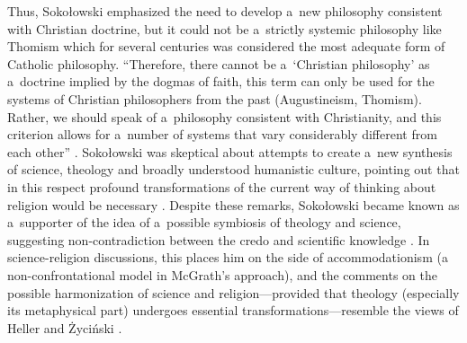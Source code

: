 \documentclass[%
  manuscript=article,
  year=2024,
  volume=77,
  doi=10.59203/zfn.77.689,
]{zfn}
\begin{document}
Thus, Sokołowski emphasized the need to develop a~new philosophy consistent with Christian doctrine, but it could not be a~strictly systemic philosophy like Thomism which for several centuries was considered the most adequate form of Catholic philosophy. ``Therefore, there cannot be a~‘Christian philosophy' as a~doctrine implied by the dogmas of faith, this term can only be used for the systems of Christian philosophers from the past (Augustineism, Thomism). Rather, we should speak of a~philosophy consistent with Christianity, and this criterion allows for a~number of systems that vary considerably different from each other''
\parencite[][p.199]{Sokoowski1989Gos}. %
 Sokołowski was skeptical about attempts to create a~new synthesis of science, theology and broadly understood humanistic culture, pointing out that in this respect profound transformations of the current way of thinking about religion would be necessary 
\parencite[][p.265]{Sokoowski1991Posowie}. %
 Despite these remarks, Sokołowski became known as a~supporter of the idea of a~possible symbiosis of theology and science, suggesting non-contradiction between the credo and scientific knowledge 
\parencites[se e.g.,][p.214]{Sokoowski2001Wspoczesne}[][p.180]{Sokoowski2014Czy}. %
 In science-religion discussions, this places him on the side of accommodationism (a non-confrontational model in McGrath's approach), and the comments on the possible harmonization of science and religion---provided that theology (especially its metaphysical part) undergoes essential transformations---resemble the views of Heller and Życiński 
\parencite[see e.g.,][]{Zycinski1990Trzy}.%
\end{document}
